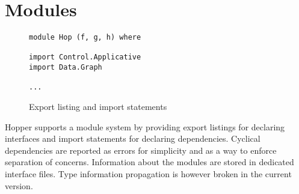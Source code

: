 \section{Modules}

\begin{figure}[!htb]
\centering
\begin{lstlisting} 
module Hop (f, g, h) where

import Control.Applicative
import Data.Graph

...
\end{lstlisting}
\caption{Export listing and import statements}
\label{lst:exportimport}
\end{figure}


Hopper supports a module system by providing export listings for declaring interfaces and import statements for declaring dependencies. Cyclical dependencies are reported as errors for simplicity and as a way to enforce separation of concerns.
Information about the modules are stored in dedicated interface files. Type information propagation is however broken in the current version.
